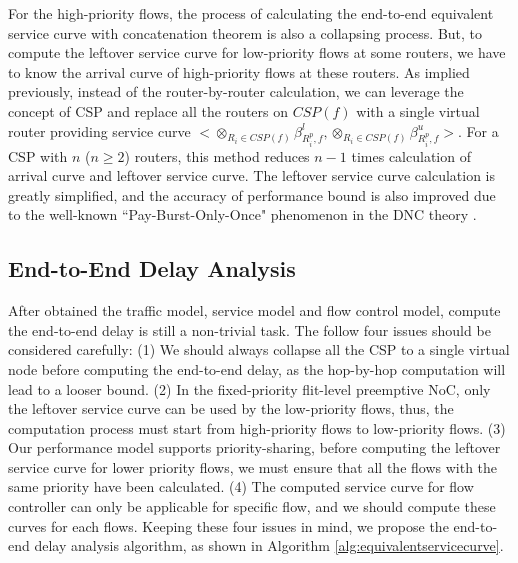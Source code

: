 \documentclass[10pt,journal]{IEEEtran}
\begin{document}
For the high-priority flows, the process of calculating the end-to-end equivalent service curve with concatenation theorem is also a collapsing process. But, to compute the leftover service curve for low-priority flows at some routers, we have to know the arrival curve of high-priority flows at these routers. As implied previously, instead of the router-by-router calculation, we can leverage the concept of CSP and replace all the routers on $CSP(f)$ with a single virtual router providing service curve $<\otimes_{R_i\in CSP(f)}\beta_{R_i^{p},f}^l,\otimes_{R_i\in CSP(f)}\beta_{R_i^{p},f}^u>$. For a CSP with $n$ ($n\geq 2$) routers, this method reduces $n-1$ times calculation of arrival curve and leftover service curve. The leftover service curve calculation is greatly simplified, and the accuracy of performance bound is also improved due to the well-known ``Pay-Burst-Only-Once" phenomenon in the DNC theory \cite{Boudec2001Network}.

\subsection{End-to-End Delay Analysis}\label{e2elatency}
After obtained the traffic model, service model and flow control model, compute the end-to-end delay is still a non-trivial task. The follow four issues should be considered carefully: (1) We should always collapse all the CSP to a single virtual node before computing the end-to-end delay, as the hop-by-hop computation will lead to a looser bound. (2) In the fixed-priority flit-level preemptive NoC, only the leftover service curve can be used by the low-priority flows, thus, the computation process must start from high-priority flows to low-priority flows. (3) Our performance model supports priority-sharing, before computing the leftover service curve for lower priority flows, we must ensure that all the flows with the same priority have been calculated. (4) The computed service curve for flow controller can only be applicable for specific flow, and we should compute these curves for each flows. Keeping these four issues in mind, we propose the end-to-end delay analysis algorithm, as shown in Algorithm \ref{alg:equivalentservicecurve}.
\end{document}
